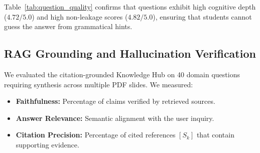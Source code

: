 \documentclass[conference]{IEEEtran}
\begin{document}
\begin{table}[t]
\caption{Human Evaluation of Generated Socratic Probes (5-Point Likert Scale)}
\label{tab:question_quality}
\centering
\setlength{\tabcolsep}{4pt}
\end{table}

Table~\ref{tab:question_quality} confirms that questions exhibit high cognitive depth ($4.72 / 5.0$) and high non-leakage scores ($4.82 / 5.0$), ensuring that students cannot guess the answer from grammatical hints.

\subsection{RAG Grounding and Hallucination Verification}
We evaluated the citation-grounded Knowledge Hub on 40 domain questions requiring synthesis across multiple PDF slides. We measured:
\begin{itemize}
    \item \textbf{Faithfulness:} Percentage of claims verified by retrieved sources.
    \item \textbf{Answer Relevance:} Semantic alignment with the user inquiry.
    \item \textbf{Citation Precision:} Percentage of cited references $[S_k]$ that contain supporting evidence.
\end{itemize}

\begin{table}[t]
\caption{Retrieval-Augmented Generation Grounding Metrics}
\label{tab:rag_metrics}
\centering
\setlength{\tabcolsep}{4pt}
\end{table}
\end{document}
